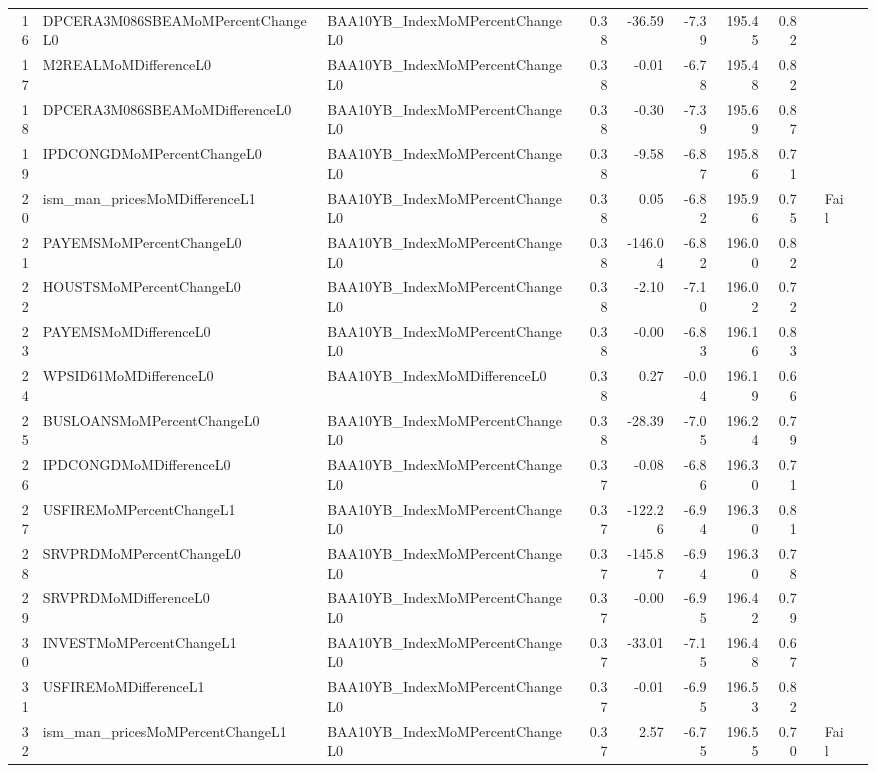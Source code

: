 \begin{longtable}{rllrrrrrlll}
  16 & DPCERA3M086SBEAMoMPercentChangeL0 & BAA10YB\_IndexMoMPercentChangeL0 & 0.38 & -36.59 & -7.39 & 195.45 & 0.82 &  &  &  \\ 
  17 & M2REALMoMDifferenceL0 & BAA10YB\_IndexMoMPercentChangeL0 & 0.38 & -0.01 & -6.78 & 195.48 & 0.82 &  &  &  \\ 
  18 & DPCERA3M086SBEAMoMDifferenceL0 & BAA10YB\_IndexMoMPercentChangeL0 & 0.38 & -0.30 & -7.39 & 195.69 & 0.87 &  &  &  \\ 
  19 & IPDCONGDMoMPercentChangeL0 & BAA10YB\_IndexMoMPercentChangeL0 & 0.38 & -9.58 & -6.87 & 195.86 & 0.71 &  &  &  \\ 
  20 & ism\_man\_pricesMoMDifferenceL1 & BAA10YB\_IndexMoMPercentChangeL0 & 0.38 & 0.05 & -6.82 & 195.96 & 0.75 &  & Fail &  \\ 
  21 & PAYEMSMoMPercentChangeL0 & BAA10YB\_IndexMoMPercentChangeL0 & 0.38 & -146.04 & -6.82 & 196.00 & 0.82 &  &  &  \\ 
  22 & HOUSTSMoMPercentChangeL0 & BAA10YB\_IndexMoMPercentChangeL0 & 0.38 & -2.10 & -7.10 & 196.02 & 0.72 &  &  &  \\ 
  23 & PAYEMSMoMDifferenceL0 & BAA10YB\_IndexMoMPercentChangeL0 & 0.38 & -0.00 & -6.83 & 196.16 & 0.83 &  &  &  \\ 
  24 & WPSID61MoMDifferenceL0 & BAA10YB\_IndexMoMDifferenceL0 & 0.38 & 0.27 & -0.04 & 196.19 & 0.66 &  &  &  \\ 
  25 & BUSLOANSMoMPercentChangeL0 & BAA10YB\_IndexMoMPercentChangeL0 & 0.38 & -28.39 & -7.05 & 196.24 & 0.79 &  &  &  \\ 
  26 & IPDCONGDMoMDifferenceL0 & BAA10YB\_IndexMoMPercentChangeL0 & 0.37 & -0.08 & -6.86 & 196.30 & 0.71 &  &  &  \\ 
  27 & USFIREMoMPercentChangeL1 & BAA10YB\_IndexMoMPercentChangeL0 & 0.37 & -122.26 & -6.94 & 196.30 & 0.81 &  &  &  \\ 
  28 & SRVPRDMoMPercentChangeL0 & BAA10YB\_IndexMoMPercentChangeL0 & 0.37 & -145.87 & -6.94 & 196.30 & 0.78 &  &  &  \\ 
  29 & SRVPRDMoMDifferenceL0 & BAA10YB\_IndexMoMPercentChangeL0 & 0.37 & -0.00 & -6.95 & 196.42 & 0.79 &  &  &  \\ 
  30 & INVESTMoMPercentChangeL1 & BAA10YB\_IndexMoMPercentChangeL0 & 0.37 & -33.01 & -7.15 & 196.48 & 0.67 &  &  &  \\ 
  31 & USFIREMoMDifferenceL1 & BAA10YB\_IndexMoMPercentChangeL0 & 0.37 & -0.01 & -6.95 & 196.53 & 0.82 &  &  &  \\ 
  32 & ism\_man\_pricesMoMPercentChangeL1 & BAA10YB\_IndexMoMPercentChangeL0 & 0.37 & 2.57 & -6.75 & 196.55 & 0.70 &  & Fail &  \\ 

\end{longtable}
